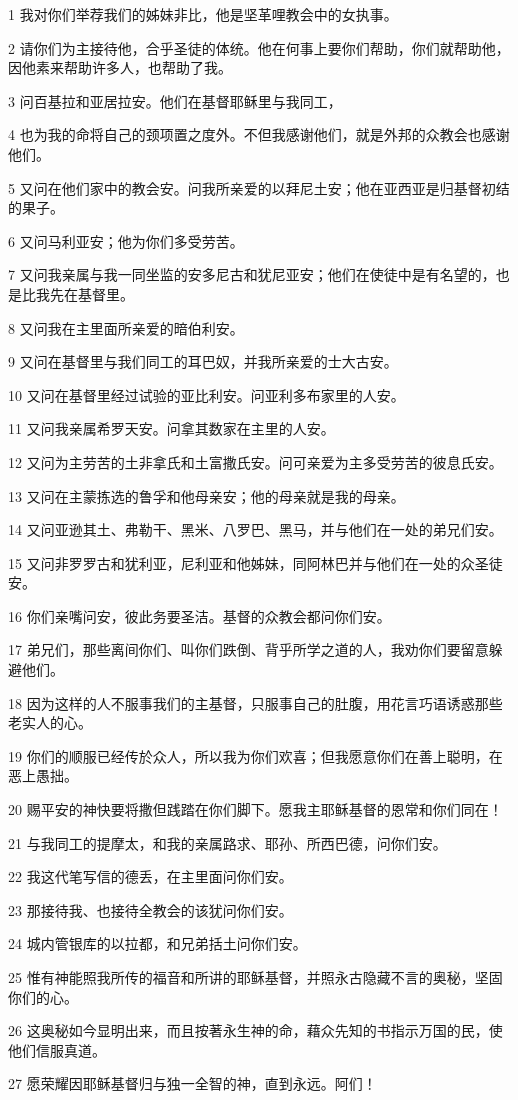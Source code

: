 \par 1 我对你们举荐我们的姊妹非比，他是坚革哩教会中的女执事。
\par 2 请你们为主接待他，合乎圣徒的体统。他在何事上要你们帮助，你们就帮助他，因他素来帮助许多人，也帮助了我。
\par 3 问百基拉和亚居拉安。他们在基督耶稣里与我同工，
\par 4 也为我的命将自己的颈项置之度外。不但我感谢他们，就是外邦的众教会也感谢他们。
\par 5 又问在他们家中的教会安。问我所亲爱的以拜尼土安；他在亚西亚是归基督初结的果子。
\par 6 又问马利亚安；他为你们多受劳苦。
\par 7 又问我亲属与我一同坐监的安多尼古和犹尼亚安；他们在使徒中是有名望的，也是比我先在基督里。
\par 8 又问我在主里面所亲爱的暗伯利安。
\par 9 又问在基督里与我们同工的耳巴奴，并我所亲爱的士大古安。
\par 10 又问在基督里经过试验的亚比利安。问亚利多布家里的人安。
\par 11 又问我亲属希罗天安。问拿其数家在主里的人安。
\par 12 又问为主劳苦的土非拿氏和土富撒氏安。问可亲爱为主多受劳苦的彼息氏安。
\par 13 又问在主蒙拣选的鲁孚和他母亲安；他的母亲就是我的母亲。
\par 14 又问亚逊其土、弗勒干、黑米、八罗巴、黑马，并与他们在一处的弟兄们安。
\par 15 又问非罗罗古和犹利亚，尼利亚和他姊妹，同阿林巴并与他们在一处的众圣徒安。
\par 16 你们亲嘴问安，彼此务要圣洁。基督的众教会都问你们安。
\par 17 弟兄们，那些离间你们、叫你们跌倒、背乎所学之道的人，我劝你们要留意躲避他们。
\par 18 因为这样的人不服事我们的主基督，只服事自己的肚腹，用花言巧语诱惑那些老实人的心。
\par 19 你们的顺服已经传於众人，所以我为你们欢喜；但我愿意你们在善上聪明，在恶上愚拙。
\par 20 赐平安的神快要将撒但践踏在你们脚下。愿我主耶稣基督的恩常和你们同在！
\par 21 与我同工的提摩太，和我的亲属路求、耶孙、所西巴德，问你们安。
\par 22 我这代笔写信的德丢，在主里面问你们安。
\par 23 那接待我、也接待全教会的该犹问你们安。
\par 24 城内管银库的以拉都，和兄弟括土问你们安。
\par 25 惟有神能照我所传的福音和所讲的耶稣基督，并照永古隐藏不言的奥秘，坚固你们的心。
\par 26 这奥秘如今显明出来，而且按著永生神的命，藉众先知的书指示万国的民，使他们信服真道。
\par 27 愿荣耀因耶稣基督归与独一全智的神，直到永远。阿们！


